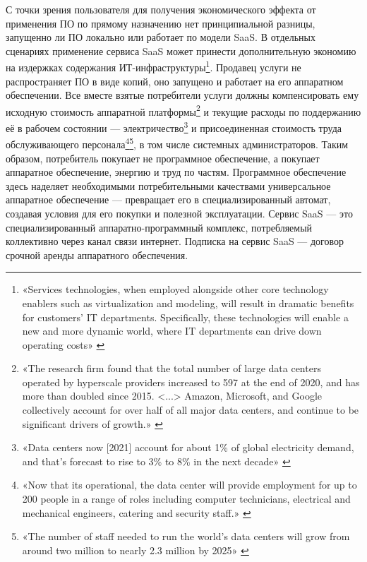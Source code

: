 \documentclass{article}
\begin{document}
С точки зрения пользователя для получения экономического эффекта от применения ПО по прямому назначению нет принципиальной разницы, запущенно ли ПО локально или работает по модели SaaS. В отдельных сценариях применение сервиса SaaS может принести дополнительную экономию на издержках содержания ИТ-инфраструктуры\footnote{«Services technologies, when employed alongside other core technology enablers such as virtualization and modeling, will result in dramatic benefits for customers’ IT departments. Specifically, these technologies will enable a new and more dynamic world, where IT departments can drive down operating costs» \cite{microsoftAzureAnnounce2008}}. Продавец услуги не распространяет ПО в виде копий, оно запущено и работает на его аппаратном обеспечении. Все вместе взятые потребители услуги должны компенсировать ему исходную стоимость аппаратной платформы\footnote{«The research firm found that the total number of large data centers operated by hyperscale providers increased to 597 at the end of 2020, and has more than doubled since 2015. <...> Amazon, Microsoft, and Google collectively account for over half of all major data centers, and continue to be significant drivers of growth.» \cite{dataCenters2021}} и текущие расходы по поддержанию её в рабочем состоянии — электричество\footnote{«Data centers now [2021] account for about 1\% of global electricity demand, and that’s forecast to rise to 3\% to 8\% in the next decade» \cite{saasEnegry2021}} и присоединенная стоимость труда обслуживающего персонала\footnote{«Now that its operational, the data center will provide employment for up to 200 people in a range of roles including computer technicians, electrical and mechanical engineers, catering and security staff.» \cite{googleDutchDataCenter2016}}\footnote{«The number of staff needed to run the world's data centers will grow from around two million to nearly 2.3 million by 2025» \cite{dataCentersNeedStaff2021}}, в том числе системных администраторов. Таким образом, потребитель покупает не программное обеспечение, а покупает аппаратное обеспечение, энергию и труд по частям. Программное обеспечение здесь наделяет необходимыми потребительными качествами универсальное аппаратное обеспечение — превращает его в специализированный автомат, создавая условия для его покупки и полезной эксплуатации. Сервис SaaS — это специализированный аппаратно-программный комплекс, потребляемый коллективно через канал связи интернет. Подписка на сервис SaaS — договор срочной аренды аппаратного обеспечения.
\end{document}
